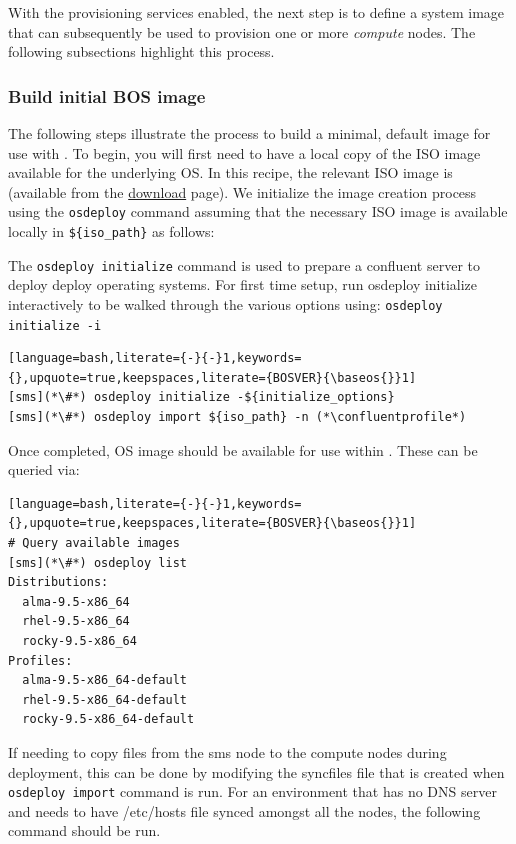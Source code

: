 
With the provisioning services enabled, the next step is to define
a system image that can subsequently be
used to provision one or more {\em compute} nodes. The following subsections highlight this process.

\subsubsection{Build initial BOS image} \label{sec:assemble_bos}
The following steps illustrate the process to build a minimal, default image for use with \Confluent{}. To begin, you will
first need to have a local copy of the ISO image available for the underlying OS. In this recipe, the relevant ISO image
is \texttt{\isoimage{}} (available from the \OS{}
\href{\downloadpage{}}{\color{blue}download} page).
We initialize the image
creation process using the \texttt{osdeploy} command assuming that the necessary ISO image is available locally in
\texttt{\$\{iso\_path\}} as follows:

The \texttt{osdeploy initialize} command is used to prepare a confluent server to deploy deploy operating systems.
For first time setup, run osdeploy initialize interactively to be walked through the various options using:
\texttt{osdeploy initialize -i}

\begin{lstlisting}[language=bash,literate={-}{-}1,keywords={},upquote=true,keepspaces,literate={BOSVER}{\baseos{}}1]
[sms](*\#*) osdeploy initialize -${initialize_options}
[sms](*\#*) osdeploy import ${iso_path} -n (*\confluentprofile*)

\end{lstlisting}

\noindent Once completed, OS image should be available for use within \Confluent{}. These can be queried via:

\begin{lstlisting}[language=bash,literate={-}{-}1,keywords={},upquote=true,keepspaces,literate={BOSVER}{\baseos{}}1]
# Query available images
[sms](*\#*) osdeploy list
Distributions:
  alma-9.5-x86_64
  rhel-9.5-x86_64
  rocky-9.5-x86_64
Profiles:
  alma-9.5-x86_64-default
  rhel-9.5-x86_64-default
  rocky-9.5-x86_64-default
\end{lstlisting}

If needing to copy files from the sms node to the compute nodes during deployment, this can be done by
modifying the syncfiles file that is created when \texttt{osdeploy import} command is run. For an environment
that has no DNS server and needs to have /etc/hosts file synced amongst all the nodes, the following command
should be run.

